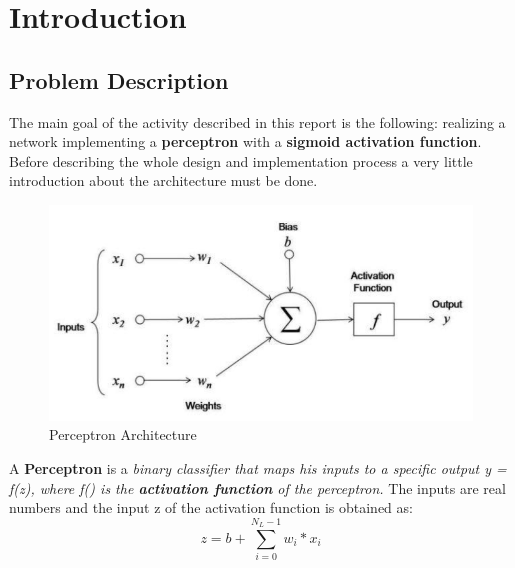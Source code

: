 \chapter{Introduction}
\section{Problem Description}
The main goal of the activity described in this report is the following: realizing a network implementing a \textbf{perceptron} with a \textbf{sigmoid activation function}.\\
Before describing the whole design and implementation process a very little introduction about the architecture must be done.\\

\begin{figure}[h]
	\centering
	\includegraphics[width=\textwidth]{img/perceptron.png}
	\caption{Perceptron Architecture}
\end{figure}

A \textbf{Perceptron} is a \textit{binary classifier that maps his inputs to a specific output y = f(z), where f() is the \textbf{activation function} of the perceptron.} The inputs are real numbers and the input z of the activation function is obtained as:\\
\begin{equation}
	z = b + \sum_{i = 0}^{N_{L}-1}w_{i}*x_{i}
\end{equation}

